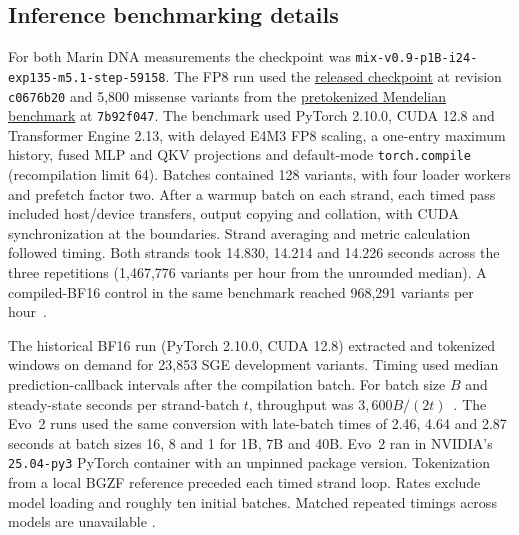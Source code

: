 \documentclass[a4paper,num-refs]{oup-contemporary}
\begin{document}
\subsection{Inference benchmarking details}\label{supp:inference}

For both Marin DNA measurements the checkpoint was
\nolinkurl{mix-v0.9-p1B-i24-exp135-m5.1-step-59158}. The FP8 run used the
\href{https://huggingface.co/marin-dna/marin-dna-exp135-m5.1/tree/c0676b2012b8b9c526deb26ff517f6b92b6d375d}{released checkpoint}
at revision \texttt{c0676b20} and 5,800 missense variants from the
\href{https://huggingface.co/datasets/marin-dna/evals_mendelian_traits_harness_255/tree/7b92f047f9a36f90e9ac47886afa2a99264ee35c}{pretokenized Mendelian benchmark}
at \texttt{7b92f047}. The benchmark used PyTorch 2.10.0, CUDA 12.8 and
Transformer Engine 2.13, with delayed E4M3 FP8 scaling, a one-entry
maximum history, fused MLP and QKV projections and default-mode
\texttt{torch.compile} (recompilation limit 64). Batches contained 128
variants, with four loader workers and prefetch factor two.
After a warmup batch on each strand, each timed pass included host/device
transfers, output copying and collation, with CUDA synchronization at the
boundaries. Strand averaging and metric calculation followed timing.
Both strands took 14.830, 14.214 and 14.226 seconds across the three
repetitions (1,467,776 variants per hour from the unrounded median).
A compiled-BF16 control in the same benchmark reached 968,291 variants
per hour~\citep{marindna430,marindna430code}.

The historical BF16 run (PyTorch 2.10.0, CUDA 12.8) extracted and
tokenized windows on demand for 23,853 SGE development variants. Timing
used median prediction-callback intervals after the compilation batch. For batch size $B$ and steady-state seconds per
strand-batch $t$, throughput was $3{,}600B/(2t)$~\citep{marindna354,marindna354code}.
The Evo~2 runs used the same conversion with late-batch times of 2.46,
4.64 and 2.87 seconds at batch sizes 16, 8 and 1 for 1B, 7B and 40B.
Evo~2 ran in NVIDIA's \texttt{25.04-py3} PyTorch container with an
unpinned package version. Tokenization from a local BGZF reference
preceded each timed strand loop. Rates exclude model loading and roughly
ten initial batches. Matched repeated timings across models are unavailable
\citep{marindna131,marindnaevo2code}.
\end{document}
